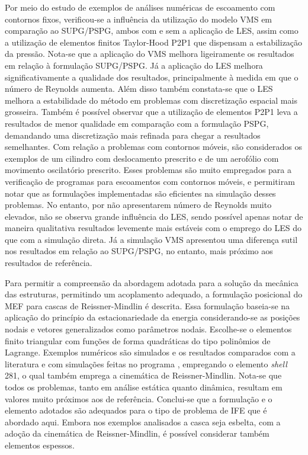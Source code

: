 Por meio do estudo de exemplos de análises numéricas de escoamento com contornos fixos, verificou-se a influência da utilização do modelo VMS em comparação ao SUPG/PSPG, ambos com e sem a aplicação de LES, assim como a utilização de elementos finitos Taylor-Hood P2P1 que dispensam a estabilização da pressão. Nota-se que a aplicação do VMS melhora ligeiramente os resultados em relação à formulação SUPG/PSPG. Já a aplicação do LES melhora significativamente a qualidade dos resultados, principalmente à medida em que o número de Reynolds aumenta. Além disso também constata-se que o LES melhora a estabilidade do método em problemas com discretização espacial mais grosseira. Também é possível observar que a utilização de elementos P2P1 leva a resultados de menor qualidade em comparação com a formulação PSPG, demandando uma discretização mais refinada para chegar a resultados semelhantes. Com relação a problemas com contornos móveis, são considerados os exemplos de um cilindro com deslocamento prescrito e de um aerofólio com movimento oscilatório prescrito. Esses problemas são muito empregados para a verificação de programas para escoamentos com contornos móveis, e permitiram notar que as formulações implementadas são eficientes na simulação desses problemas. No entanto, por não apresentarem número de Reynolds muito elevados, não se observa grande influência do LES, sendo possível apenas notar de maneira qualitativa resultados levemente mais estáveis com o emprego do LES do que com a simulação direta. Já a simulação VMS apresentou uma diferença sutil nos resultados em relação ao SUPG/PSPG, no entanto, mais próximo aos resultados de referência.

Para permitir a compreensão da abordagem adotada para a solução da mecânica das estruturas, permitindo um acoplamento adequado, a formulação posicional do MEF para cascas de Reissner-Mindlin é descrita. Essa formulação baseia-se na aplicação do princípio da estacionariedade da energia considerando-se as posições nodais e vetores generalizados como parâmetros nodais. Escolhe-se o elementos finito triangular com funções de forma quadráticas do tipo polinômios de Lagrange. Exemplos numéricos são simulados e os resultados comparados com a literatura e com simulações feitas no programa , empregando o elemento \textit{shell} 281, o qual também emprega a cinemática de Reissner-Mindlin. Nota-se que todos os problemas, tanto em análise estática quanto dinâmica, resultam em valores muito próximos aos de referência. Conclui-se que a formulação e o elemento adotados são adequados para o tipo de problema de IFE que é abordado aqui. Embora nos exemplos analisados a casca seja esbelta, com a adoção da cinemática de Reissner-Mindlin, é possível considerar também elementos espessos.

